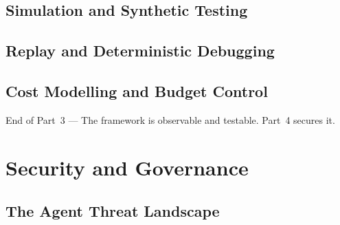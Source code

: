 \documentclass[
  11pt,
  twoside,
  openright
]{book}
\makeatletter
\renewcommand{\cleardoublepage}{%
  \clearpage
  \if@twoside
    \ifodd\c@page
    \else
      \thispagestyle{empty}%
      \hbox{}%
      \newpage
      \if@twocolumn\hbox{}\newpage\fi
    \fi
  \fi
}
\newcommand{\partclose}[1]{%
  \cleardoublepage
  \vspace*{\fill}
  \begin{center}
    \sffamily\Large\color{BookBlue}#1
  \end{center}
  \vspace*{\fill}
  \cleardoublepage
}
\makeatother
\begin{document}
\chapter{Simulation and Synthetic Testing}
\label{ch:simulation}

\chapter{Replay and Deterministic Debugging}
\label{ch:replay}

\chapter{Cost Modelling and Budget Control}
\label{ch:cost-modelling}

\partclose{End of Part~3 --- The framework is observable and testable.
Part~4 secures it.}

\part{Security and Governance}
\label{part:security}

\chapter{The Agent Threat Landscape}
\label{ch:threat-landscape}

\end{document}

